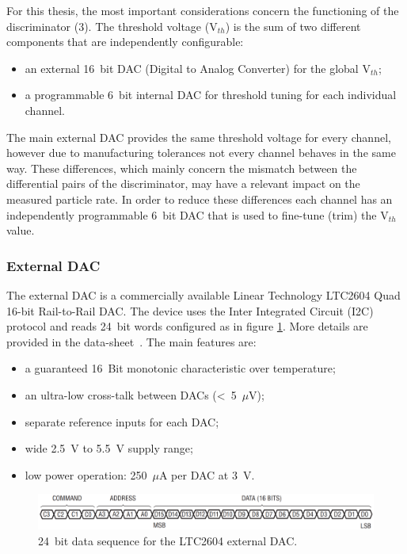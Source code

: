 \noindent For this thesis, the most important considerations concern the functioning of the discriminator (3).
The threshold voltage (V$_{th}$) is the sum of two different components that are independently configurable:
\begin{itemize}
	\item an external 16~bit DAC (Digital to Analog Converter) for the global V$_{th}$;
	\item a programmable 6~bit internal DAC for threshold tuning for each individual channel.
\end{itemize}
\noindent The main external DAC provides the same threshold voltage for every channel, however due to manufacturing tolerances not every channel behaves in the same way.
These differences, which mainly concern the mismatch between the differential pairs of the discriminator, may have a relevant impact on the measured particle rate.
In order to reduce these differences each channel has an independently programmable 6~bit DAC that is used to fine-tune (trim) the V$_{th}$ value.    
\subsubsection{External DAC}
The external DAC is a commercially available Linear Technology LTC2604 Quad 16-bit Rail-to-Rail DAC.
The device uses the Inter Integrated Circuit (I2C) protocol and reads 24~bit words configured as in figure \ref{fig:extdactiming2}.
More details are provided in the data-sheet~\cite{LTC2604}.
The main features are:
\begin{itemize}
	\item a guaranteed 16~Bit monotonic characteristic over temperature;
	\item an ultra-low cross-talk between DACs (<~5~$\mu$V);
	\item separate reference inputs for each DAC;
	\item wide 2.5~V to 5.5~V supply range;
	\item low power operation: 250~$\mu$A per DAC at 3~V.
\end{itemize} 
\begin{figure}[H]
	\centering
	\includegraphics[width=0.99\linewidth]{IMG/ch2/EXTDACTIMING2}
	\caption{24~bit data sequence for the LTC2604 external DAC.}
	\label{fig:extdactiming2}
\end{figure}
